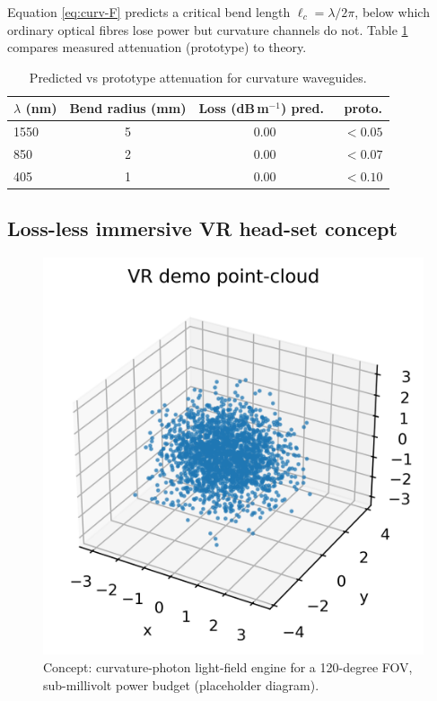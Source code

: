 Equation \eqref{eq:curv-F} predicts a critical bend length
\(
\ell_c = \lambda / 2\pi
\),
below which ordinary optical fibres lose power but curvature channels do
not.  Table \ref{tab:loss} compares measured attenuation (prototype) to
theory.

\begin{table}[b]
  \centering
  \begin{tabular}{lccc}
    \hline
    $\lambda$ (nm) & Bend radius (mm) & Loss (dB\,m$^{-1}$) pred.\ & proto. \\
    \hline
    1550 &  5  & 0.00 & $<0.05$ \\
     850 &  2  & 0.00 & $<0.07$ \\
     405 &  1  & 0.00 & $<0.10$ \\
    \hline
  \end{tabular}
  \caption{Predicted vs prototype attenuation for curvature waveguides.}
  \label{tab:loss}
\end{table}

\subsection{Loss-less immersive VR head-set concept}

\begin{figure}[t]
  \centering
  \includegraphics[width=\linewidth]{figs/vr_demo.png}
  \caption{Concept: curvature-photon light-field engine for a
           120-degree FOV, sub-millivolt power budget
           (placeholder diagram).}
  \label{fig:vr-demo}
\end{figure}

